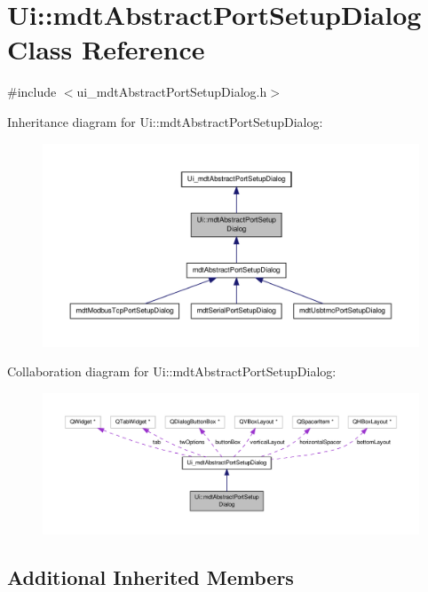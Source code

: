 \hypertarget{class_ui_1_1mdt_abstract_port_setup_dialog}{\section{Ui\-:\-:mdt\-Abstract\-Port\-Setup\-Dialog Class Reference}
\label{class_ui_1_1mdt_abstract_port_setup_dialog}
}


{\ttfamily \#include $<$ui\-\_\-mdt\-Abstract\-Port\-Setup\-Dialog.\-h$>$}



Inheritance diagram for Ui\-:\-:mdt\-Abstract\-Port\-Setup\-Dialog\-:
\nopagebreak
\begin{figure}[H]
\begin{center}
\leavevmode
\includegraphics[width=350pt]{class_ui_1_1mdt_abstract_port_setup_dialog__inherit__graph}
\end{center}
\end{figure}


Collaboration diagram for Ui\-:\-:mdt\-Abstract\-Port\-Setup\-Dialog\-:
\nopagebreak
\begin{figure}[H]
\begin{center}
\leavevmode
\includegraphics[width=350pt]{class_ui_1_1mdt_abstract_port_setup_dialog__coll__graph}
\end{center}
\end{figure}
\subsection*{Additional Inherited Members}


